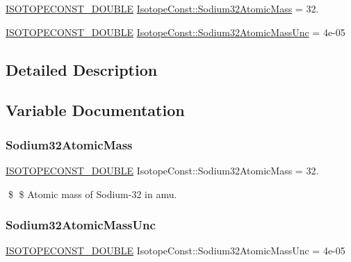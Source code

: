 \begin{DoxyCompactItemize}
\item 
\mbox{\hyperlink{group___isotope_const-_macros_ga8f45a7272ce02c0b4c65c44636ed719a}{I\+S\+O\+T\+O\+P\+E\+C\+O\+N\+S\+T\+\_\+\+D\+O\+U\+B\+LE}} \mbox{\hyperlink{group___isotope_const-_sodium-_na32_ga154e1c6b8836556620e1de80c6ced8d2}{Isotope\+Const\+::\+Sodium32\+Atomic\+Mass}} = 32.
\item 
\mbox{\hyperlink{group___isotope_const-_macros_ga8f45a7272ce02c0b4c65c44636ed719a}{I\+S\+O\+T\+O\+P\+E\+C\+O\+N\+S\+T\+\_\+\+D\+O\+U\+B\+LE}} \mbox{\hyperlink{group___isotope_const-_sodium-_na32_gae225c892adf1507a9bc184bb726da957}{Isotope\+Const\+::\+Sodium32\+Atomic\+Mass\+Unc}} = 4e-\/05
\end{DoxyCompactItemize}


\subsection{Detailed Description}


\subsection{Variable Documentation}
\mbox{\label{group___isotope_const-_sodium-_na32_ga154e1c6b8836556620e1de80c6ced8d2}} 
\subsubsection{\texorpdfstring{Sodium32\+Atomic\+Mass}{Sodium32AtomicMass}}
{\footnotesize\ttfamily \mbox{\hyperlink{group___isotope_const-_macros_ga8f45a7272ce02c0b4c65c44636ed719a}{I\+S\+O\+T\+O\+P\+E\+C\+O\+N\+S\+T\+\_\+\+D\+O\+U\+B\+LE}} Isotope\+Const\+::\+Sodium32\+Atomic\+Mass = 32.}

\$ \$ Atomic mass of Sodium-\/32 in amu. \mbox{\label{group___isotope_const-_sodium-_na32_gae225c892adf1507a9bc184bb726da957}} 
\subsubsection{\texorpdfstring{Sodium32\+Atomic\+Mass\+Unc}{Sodium32AtomicMassUnc}}
{\footnotesize\ttfamily \mbox{\hyperlink{group___isotope_const-_macros_ga8f45a7272ce02c0b4c65c44636ed719a}{I\+S\+O\+T\+O\+P\+E\+C\+O\+N\+S\+T\+\_\+\+D\+O\+U\+B\+LE}} Isotope\+Const\+::\+Sodium32\+Atomic\+Mass\+Unc = 4e-\/05}

